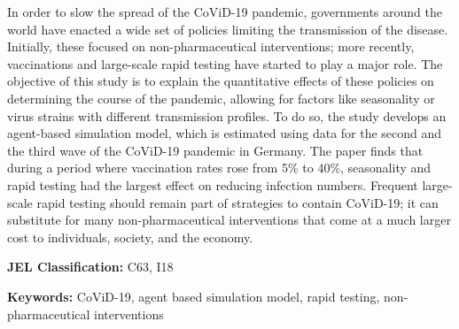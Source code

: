 \noindent
In order to slow the spread of the CoViD-19 pandemic, governments around the world have
enacted a wide set of policies limiting the transmission of the disease. Initially, these
focused on non-pharmaceutical interventions; more recently, vaccinations and large-scale
rapid testing have started to play a major role. The objective of this study is to
explain the quantitative effects of these policies on determining the course of the
pandemic, allowing for factors like seasonality or virus strains with different
transmission profiles. To do so, the study develops an agent-based simulation model,
which is estimated using data for the second and the third wave of the CoViD-19 pandemic
in Germany. The paper finds that during a period where vaccination rates rose from 5\% to
40\%, seasonality and rapid testing had the largest effect on reducing infection numbers.
Frequent large-scale rapid testing should remain part of strategies to contain CoViD-19;
it can substitute for many non-pharmaceutical interventions that come at a much larger
cost to individuals, society, and the economy.

\vspace{1cm}
\noindent \textbf{JEL Classification:} C63, I18

\noindent \textbf{Keywords:} CoViD-19, agent based simulation model, rapid testing,
non-pharmaceutical interventions